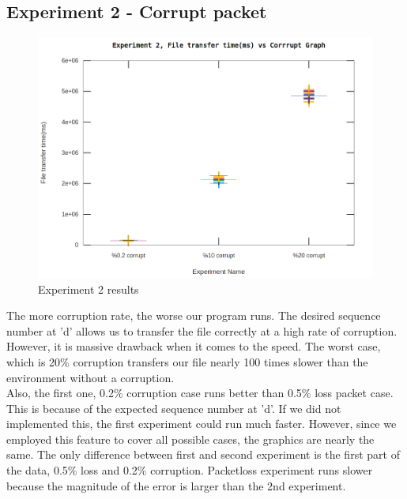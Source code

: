 \documentclass[12pt,journal,compsoc]{IEEEtran}
\begin{document}
\subsection{Experiment 2 - Corrupt packet}
\begin{figure}[h!]
\centering
\captionsetup{justification=centering}
\includegraphics[width = \linewidth]{exp2.png}
\caption{Experiment 2 results}
\label{fig:exp2}
\end{figure}
The more corruption rate, the worse our program runs. The desired sequence number at 'd' allows us to transfer the file correctly at a high rate of corruption. However, it is massive drawback when it comes to the speed.
The worst case, which is 20\% corruption transfers our file nearly 100 times slower than the environment without a corruption.\\
Also, the first one, 0.2\% corruption case runs better than 0.5\% loss packet case. This is because of the expected sequence number at 'd'. If we did not implemented this, the first experiment could run much faster. However, since we employed this feature to cover all possible cases, the graphics are nearly the same. The only difference between first and second experiment is the first part of the data, 0.5\% loss and 0.2\% corruption. Packetloss experiment runs slower because the magnitude of the error is larger than the 2nd experiment.\\
\end{document}
